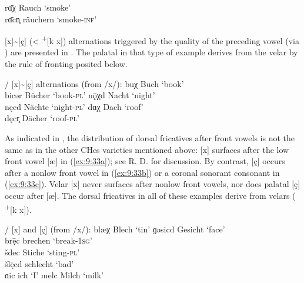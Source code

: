 \begin{xlist}
  \sn
rɑ̄χ \tab  [rɑːx] \tab Rauch \tab ‘smoke’ \\
rɑ̄cn̥ \tab [rɑːçn̩] \tab räuchern \tab ‘smoke-\textsc{inf}’ 
\end{xlist}
\z 

[x]{\textasciitilde}[ç] (< \textsuperscript{+}[k x]) alternations triggered by the quality of the preceding vowel (via ) are presented in . The palatal in that type of example derives from the velar by the rule of fronting posited below.

\ea%
\label{ex:9:32}/ [x]{\textasciitilde}[ç] alternations (from /x/):
\ea\label{ex:9:32a}   buχ \tab [bux] \tab Buch \tab ‘book’ \\
      bicər \tab [biçər] \tab Bücher \tab ‘book-\textsc{pl}’ 
\ex\label{ex:9:32b}   nǭχd \tab [nɔːxt] \tab Nacht \tab ‘night’ \\
      nęcd \tab [nɛçt] \tab Nächte \tab ‘night-\textsc{pl}’ 
\ex\label{ex:9:32c}   dɑχ \tab [dɑx] \tab Dach \tab ‘roof’ \\
      dęcr̥ \tab [dɛçr̩] \tab Dächer \tab ‘roof-\textsc{pl}’ 
\z 
\z 

As indicated in , the distribution of dorsal fricatives after front vowels is not the same as in the other CHes varieties mentioned above: [x] surfaces after the low front vowel [æ] in (\ref{ex:9:33a}); see R. D. \citet[18]{Hall1973} for discussion. By contrast, [ç] occurs after a nonlow front vowel in (\ref{ex:9:33b}) or a coronal sonorant consonant in (\ref{ex:9:33c}). Velar [x] never surfaces after nonlow front vowels, nor does palatal [ç] occur after [æ]. The dorsal fricatives in all of these examples derive from velars (  \textsuperscript{+}[k x]).

\ea%
\label{ex:9:33}/ [x] and [ç] (from /x/):
\ea\label{ex:9:33a}   blæχ \tab [blæx] \tab Blech \tab ‘tin’ 
\ex\label{ex:9:33b}   ɡəsicd \tab [gəsiçt] \tab Gesicht \tab ‘face’ \\
      brẹ̄c \tab [breːç] \tab brechen \tab ‘break-\textsc{1sg}’ \\
      šdec \tab [ʃdeç] \tab Stiche \tab ‘sting-\textsc{pl}’ \\
      šl\={ę}cd \tab [ʃlɛːçt] \tab schlecht \tab ‘bad’ \\
      ɑic \tab [ɑiç] \tab ich \tab ‘I’ 
\ex\label{ex:9:33c}   melc \tab [melç] \tab Milch \tab ‘milk’ 
\z 
\z 

